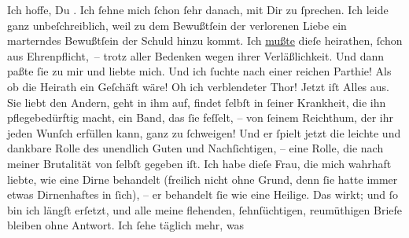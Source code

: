 \pstart
           Ich hoffe, Du \label{K_L03362-2v}\label{K_L03362-2}. Ich ſehne mich ſchon ſehr danach, mit Dir zu ſprechen. Ich leide {\pb}ganz unbeſchreiblich, weil zu dem Bewußtſein der
               verlorenen Liebe ein marterndes Bewußtſein der Schuld hinzu kommt. Ich \uline{mußte} dieſe \label{K_L03362-3v}\label{K_L03362-3} heirathen, ſchon aus Ehrenpflicht, – trotz aller Bedenken wegen ihrer
               Verläßlichkeit. Und dann paßte ſie zu mir und liebte mich. Und ich ſuchte nach einer
               reichen Parthie! Als ob die Heirath ein Geſchäft wäre! Oh ich verblendeter Thor!
               Jetzt iſt {\pb}Alles aus. Sie liebt den Andern, geht in ihm auf, findet ſelbſt in
               ſeiner Krankheit, die ihn pflegebedürftig macht, ein \strikeout{\textcolor{gray}{w}} Band, das ſie feſſelt, – von ſeinem Reichthum, der ihr jeden Wunſch erfüllen
               kann, ganz zu ſchweigen! Und er ſpielt  jetzt die
               leichte und dankbare Rolle des unendlich Guten und Nachſichtigen, – eine Rolle, die
               nach meiner Brutalität von ſelbſt gegeben iſt. Ich habe dieſe Frau, die mich wahrhaft liebte, wie eine
                  {\pb}Dirne behandelt (freilich nicht ohne Grund, denn
               ſie hatte immer etwas Dirnenhaftes in ſich), – er behandelt ſie wie eine
               Heilige. Das wirkt; und ſo bin ich längſt erſetzt, und alle meine flehenden,
               ſehnſüchtigen, reumüthigen Briefe bleiben ohne Antwort. Ich ſehe täglich mehr, was
